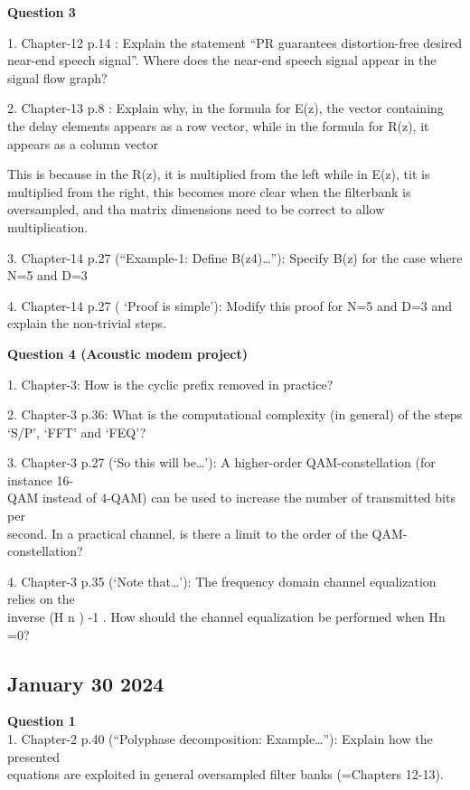 \documentclass[
  a4paper,
  ,captions=tableheading
]{scrartcl}
\begin{document}
\textbf{Question 3}

1. Chapter-12 p.14 : Explain the statement ``PR guarantees
distortion-free desired near-end speech signal''. Where does the
near-end speech signal appear in the signal flow graph?

2. Chapter-13 p.8 : Explain why, in the formula for E(z), the vector
containing the delay elements appears as a row vector, while in the
formula for R(z), it appears as a column vector

This is because in the R(z), it is multiplied from the left while in
E(z), tit is multiplied from the right, this becomes more clear when the
filterbank is oversampled, and tha matrix dimensions need to be correct
to allow multiplication.

3. Chapter-14 p.27 (``Example-1: Define B(z4)\ldots''): Specify B(z) for
the case where N=5 and D=3

4. Chapter-14 p.27 ( `Proof is simple'): Modify this proof for N=5 and
D=3 and explain the non-trivial steps.

\textbf{Question 4 (Acoustic modem project)}

1. Chapter-3: How is the cyclic prefix removed in practice?

2. Chapter-3 p.36: What is the computational complexity (in general) of
the steps `S/P', `FFT' and `FEQ'?

3. Chapter-3 p.27 (`So this will be\ldots'): A higher-order
QAM-constellation (for instance 16-\\
QAM instead of 4-QAM) can be used to increase the number of transmitted
bits per\\
second. In a practical channel, is there a limit to the order of the
QAM-constellation?

4. Chapter-3 p.35 (`Note that\ldots'): The frequency domain channel
equalization relies on the\\
inverse (H n ) -1 . How should the channel equalization be performed
when Hn =0?

\subsection{January 30 2024}\label{january-30-2024-1}

\textbf{Question 1}\\
1. Chapter-2 p.40 (``Polyphase decomposition: Example\ldots''): Explain
how the presented\\
equations are exploited in general oversampled filter banks (=Chapters
12-13).
\end{document}

